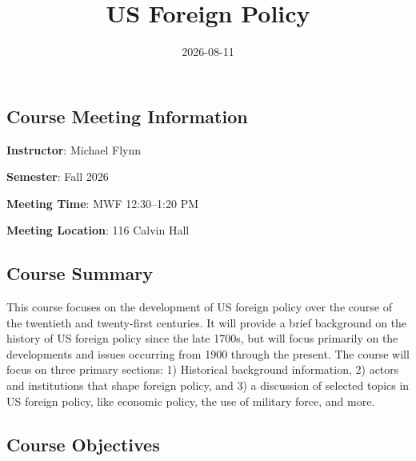 \documentclass[
  letterpaper,
  DIV=11,
  numbers=noendperiod]{scrartcl}
\title{US Foreign Policy}
\author{}
\date{2026-08-11}
\renewcommand*\contentsname{Table of contents}
\newcommand\contentsname{Table of contents}
\begin{document}
\maketitle

\renewcommand*\contentsname{Table of contents}
{
\setcounter{tocdepth}{3}
\tableofcontents
}

\subsection{Course Meeting
Information}\label{course-meeting-information}

\textbf{Instructor}: Michael Flynn

\textbf{Semester}: Fall 2026

\textbf{Meeting Time}: MWF 12:30--1:20 PM

\textbf{Meeting Location}: 116 Calvin Hall

\subsection{Course Summary}\label{course-summary}

This course focuses on the development of US foreign policy over the
course of the twentieth and twenty-first centuries. It will provide a
brief background on the history of US foreign policy since the late
1700s, but will focus primarily on the developments and issues occurring
from 1900 through the present. The course will focus on three primary
sections: 1) Historical background information, 2) actors and
institutions that shape foreign policy, and 3) a discussion of selected
topics in US foreign policy, like economic policy, the use of military
force, and more.

\subsection{Course Objectives}\label{course-objectives}
\end{document}
